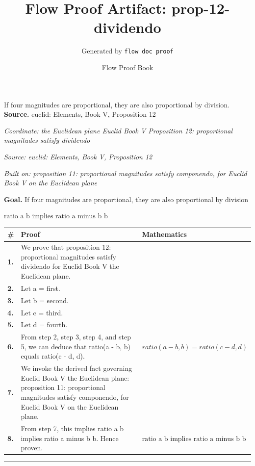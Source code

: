 \documentclass[11pt]{article}
\title{Flow Proof Artifact: prop-12-dividendo}
\author{Generated by \texttt{flow doc proof}}
\date{Flow Proof Book}
\theoremstyle{definition}
\begin{document}
\maketitle
If four magnitudes are proportional, they are also proportional by division.\\[0.5em]
\textbf{Source.} euclid: Elements, Book V, Proposition 12\\[0.5em]
\bigskip
{}\par
\smallskip\noindent\textit{Coordinate: the Euclidean plane \cdot Euclid Book V \cdot Proposition 12: proportional magnitudes satisfy dividendo}\par
\smallskip\noindent\textit{Source: euclid: Elements, Book V, Proposition 12}\par
\smallskip\noindent\textit{Built on: proposition 11: proportional magnitudes satisfy componendo, for Euclid Book V on the Euclidean plane}\par
\medskip
\noindent\textbf{Goal.} If four magnitudes are proportional, they are also proportional by division\par
\noindent$\displaystyle \text{ratio a b implies ratio a minus b b}$\par
\medskip
\noindent
\begin{tabular}{@{} >{\raggedright\arraybackslash}p{} >{\raggedright\arraybackslash}p{} >{\raggedleft\arraybackslash}p{} @{}}
\textbf{\#} & \textbf{Proof} & \textbf{Mathematics} \\
\midrule
\textbf{1.} & We prove that proposition 12: proportional magnitudes satisfy dividendo for Euclid Book V the Euclidean plane. & \\[0.45em]
\textbf{2.} & Let a = first. & \\[0.45em]
\textbf{3.} & Let b = second. & \\[0.45em]
\textbf{4.} & Let c = third. & \\[0.45em]
\textbf{5.} & Let d = fourth. & \\[0.45em]
\textbf{6.} & From step 2, step 3, step 4, and step 5, we can deduce that ratio(a - b, b) equals ratio(c - d, d). & $\displaystyle ratio(a - b, b) = ratio(c - d, d)$ \\[0.45em]
\textbf{7.} & We invoke the derived fact governing Euclid Book V the Euclidean plane: proposition 11: proportional magnitudes satisfy componendo, for Euclid Book V on the Euclidean plane. & \\[0.45em]
\textbf{8.} & From step 7, this implies ratio a b implies ratio a minus b b. Hence proven. & $\displaystyle \text{ratio a b implies ratio a minus b b}$ \\[0.45em]
\bottomrule
\end{tabular}
\label{thm:Geometry-Euclid Book V-proposition_12_proportional_magnitudes_satisfy_dividendo}
\par\medskip\hrule
\end{document}
